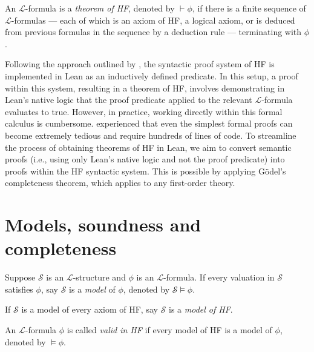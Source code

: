 \begin{definition}[Theorem of HF]
    \label{def:prf}
    An $\mathcal{L}$-formula is a \textit{theorem of HF}, denoted by $\vdash \phi$, 
    if there is a finite sequence of $\mathcal{L}$-formulas — each of which is an axiom of HF, 
    a logical axiom, or is deduced from previous formulas in the sequence by a deduction rule —
    terminating with $\phi$.
\end{definition}

Following the approach outlined by \cite{paulson2014machine}, 
the syntactic proof system of HF is implemented in Lean as an inductively defined predicate. 
In this setup, a proof within this system, resulting in a theorem of HF, 
involves demonstrating in Lean’s native logic that 
the proof predicate applied to the relevant $\mathcal{L}$-formula evaluates to true.
However, in practice, working directly within this formal calculus is cumbersome. 
\cite{paulson2014machine} experienced that even the simplest formal proofs can become extremely 
tedious and require hundreds of lines of code.
To streamline the process of obtaining theorems of HF in Lean, 
we aim to convert semantic proofs (i.e., using only Lean's native logic and not the proof predicate) 
into proofs within the HF syntactic system. 
This is possible by applying Gödel's completeness theorem, which applies to any first-order theory.

\section{Models, soundness and completeness}

\begin{definition}
    \label{def:models+Model+valid}
    \leanok
    Suppose $\mathcal{S}$ is an $\mathcal{L}$-structure and $\phi$ is an $\mathcal{L}$-formula.
    If every valuation in $\mathcal{S}$ satisfies $\phi$, 
    say $\mathcal{S}$ is a \textit{model} of $\phi$, denoted by $\mathcal{S} \vDash \phi$.

    If $\mathcal{S}$ is a model of every axiom of HF, say $\mathcal{S}$ is a \textit{model of HF}.
    
    An $\mathcal{L}$-formula $\phi$ is called \textit{valid in HF} if 
    every model of HF is a model of $\phi$, denoted by $\vDash \phi$.
\end{definition}

